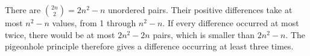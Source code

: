 There are $\binom{2n}{2}=2n^2-n$ unordered pairs. Their positive differences take at most $n^2-n$ values, from 1 through $n^2-n$. If every difference occurred at most twice, there would be at most $2n^2-2n$ pairs, which is smaller than $2n^2-n$. The pigeonhole principle therefore gives a difference occurring at least three times.
